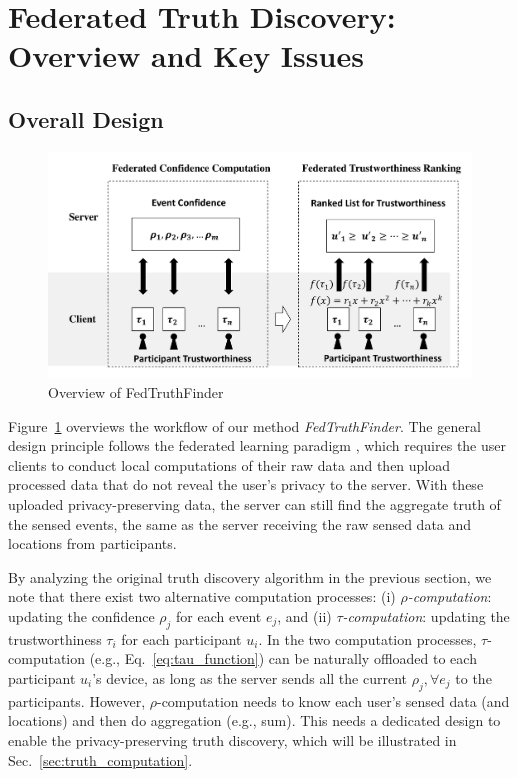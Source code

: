 \section{Federated Truth Discovery: Overview and Key Issues}

\subsection{Overall Design}

\begin{figure}
	\centering
	\includegraphics[width=.8\linewidth]{./fig/overview.pdf}
	\caption{Overview of FedTruthFinder}
	\label{fig:overview}
\end{figure}

Figure~\ref{fig:overview} overviews the workflow of our method \textit{FedTruthFinder}. The general design principle follows the federated learning paradigm \citep{yang2019federated}, which requires the user clients to conduct local computations of their raw data and then upload processed data that do not reveal the user's privacy to the server. With these uploaded privacy-preserving data, the server can still find the aggregate truth of the sensed events, the same as the server receiving the raw sensed data and locations from participants.

By analyzing the original truth discovery algorithm in the previous section, we note that there exist two alternative computation processes: (i) \textit{$\rho$-computation}: updating the confidence $\rho_j$ for each event $e_j$, and (ii) \textit{$\tau$-computation}: updating the trustworthiness $\tau_i$ for each participant $u_i$. In the two computation processes, $\tau$-computation (e.g., Eq.~\ref{eq:tau_function}) can be naturally offloaded to each participant $u_i$'s device, as long as the server sends all the current $\rho_j, \forall e_j$ to the participants. However, $\rho$-computation needs to know each user's sensed data (and locations) and then do aggregation (e.g., sum). This needs a dedicated design to enable the privacy-preserving truth discovery, which will be illustrated in Sec.~\ref{sec:truth_computation}.


